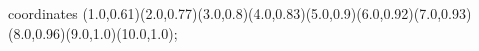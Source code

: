 					coordinates { (1.0,0.61)(2.0,0.77)(3.0,0.8)(4.0,0.83)(5.0,0.9)(6.0,0.92)(7.0,0.93)(8.0,0.96)(9.0,1.0)(10.0,1.0)};